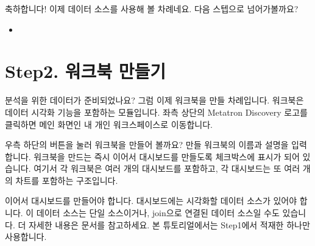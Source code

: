 \documentclass[letterpaper,10pt,english]{sphinxmanual}
\begin{document}
축하합니다! 이제 데이터 소스를 사용해 볼 차례네요. 다음 스텝으로 넘어가볼까요?
\begin{itemize}
\item {} 
{\hyperref[\detokenize{discovery/part00/step2::doc}]{}}

\end{itemize}


\section{Step2. 워크북 만들기}
\label{\detokenize{discovery/part00/step2:step2}}\label{\detokenize{discovery/part00/step2::doc}}
분석을 위한 데이터가 준비되었나요? 그럼 이제 워크북을 만들 차례입니다. 워크북은 데이터 시각화 기능을 포함하는 모듈입니다. 좌측 상단의 Metatron Discovery 로고를 클릭하면 메인 화면인 내 개인 워크스페이스로 이동합니다.
\begin{quote}

\begin{figure}[H]
\centering

\noindent{}
\end{figure}
\end{quote}

우측 하단의  버튼을 눌러 워크북을 만들어 볼까요? 만들 워크북의 이름과 설명을 입력합니다. 워크북을 만드는 즉시 이어서 대시보드를 만들도록 체크박스에 표시가 되어 있습니다. 여기서 각 워크북은 여러 개의 대시보드를 포함하고, 각 대시보드는 또 여러 개의 차트를 포함하는 구조입니다.
\begin{quote}

\begin{figure}[H]
\centering

\noindent{}
\end{figure}
\end{quote}

이어서 대시보드를 만들어야 합니다. 대시보드에는 시각화할 데이터 소스가 있어야 합니다. 이 데이터 소스는 단일 소스이거나, join으로 연결된 데이터 소스일 수도 있습니다. 더 자세한 내용은 {\hyperref[\detokenize{discovery/part04/create_a_dashboard::doc}]{}} 문서를 참고하세요. 본 튜토리얼에서는 Step1에서 적재한  하나만 사용합니다.
\begin{quote}

\begin{figure}[H]
\centering

\noindent{}
\end{figure}
\end{quote}
\end{document}
